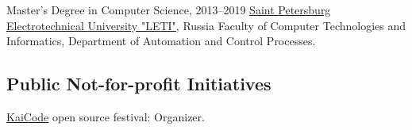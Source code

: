 \documentclass{vl}
\begin{document}
    \begin{samepage}
        Master's Degree in Computer Science, 2013--2019\newline
        \href{https://etu.ru/en/university/}{Saint Petersburg Electrotechnical University "LETI"}, Russia\newline
        Faculty of Computer Technologies and Informatics, Department of Automation and Control Processes.
    \end{samepage}

    \subsection*{Public Not-for-profit Initiatives}

    \href{https://www.kaicode.org}{KaiCode} open source festival: Organizer.
\end{document}
